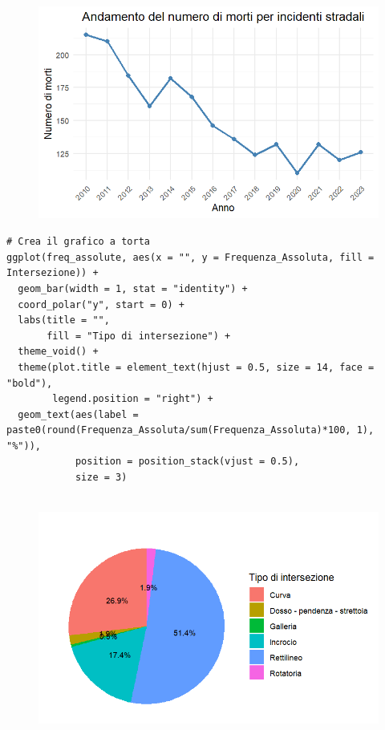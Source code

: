 \documentclass[14pt, openany, titlepage]{report} %
\begin{document}
\begin{figure}[H] %
    \centering
    \includegraphics[width=12cm, height=7cm]{Rplot01.png} %
\end{figure}

\newpage

\begin{center}
\begin{lstlisting}[breaklines=true]
# Crea il grafico a torta
ggplot(freq_assolute, aes(x = "", y = Frequenza_Assoluta, fill = Intersezione)) +
  geom_bar(width = 1, stat = "identity") +
  coord_polar("y", start = 0) +
  labs(title = "",
       fill = "Tipo di intersezione") +
  theme_void() +
  theme(plot.title = element_text(hjust = 0.5, size = 14, face = "bold"),
        legend.position = "right") +
  geom_text(aes(label = paste0(round(Frequenza_Assoluta/sum(Frequenza_Assoluta)*100, 1), "%")), 
            position = position_stack(vjust = 0.5),
            size = 3)
\end{lstlisting}  
\end{center}

\begin{figure}[H] %
    \centering
    \includegraphics[width=13cm, height=8cm]{Rplot08.png} %
\end{figure}
\end{document}
